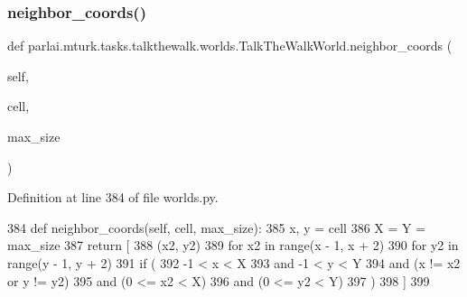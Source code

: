 \mbox{\label{classparlai_1_1mturk_1_1tasks_1_1talkthewalk_1_1worlds_1_1TalkTheWalkWorld_ae4bf42eec01e7f4d6e37fd2e9c55e4b0}} 
\subsubsection{\texorpdfstring{neighbor\+\_\+coords()}{neighbor\_coords()}}
{\footnotesize\ttfamily def parlai.\+mturk.\+tasks.\+talkthewalk.\+worlds.\+Talk\+The\+Walk\+World.\+neighbor\+\_\+coords (\begin{DoxyParamCaption}\item[{}]{self,  }\item[{}]{cell,  }\item[{}]{max\+\_\+size }\end{DoxyParamCaption})}



Definition at line 384 of file worlds.\+py.


\begin{DoxyCode}
384     \textcolor{keyword}{def }neighbor\_coords(self, cell, max\_size):
385         x, y = cell
386         X = Y = max\_size
387         \textcolor{keywordflow}{return} [
388             (x2, y2)
389             \textcolor{keywordflow}{for} x2 \textcolor{keywordflow}{in} range(x - 1, x + 2)
390             \textcolor{keywordflow}{for} y2 \textcolor{keywordflow}{in} range(y - 1, y + 2)
391             \textcolor{keywordflow}{if} (
392                 -1 < x < X
393                 \textcolor{keywordflow}{and} -1 < y < Y
394                 \textcolor{keywordflow}{and} (x != x2 \textcolor{keywordflow}{or} y != y2)
395                 \textcolor{keywordflow}{and} (0 <= x2 < X)
396                 \textcolor{keywordflow}{and} (0 <= y2 < Y)
397             )
398         ]
399 
\end{DoxyCode}
\mbox{\label{classparlai_1_1mturk_1_1tasks_1_1talkthewalk_1_1worlds_1_1TalkTheWalkWorld_a9e6fdd57358e381a4b47163eb6176569}} 

